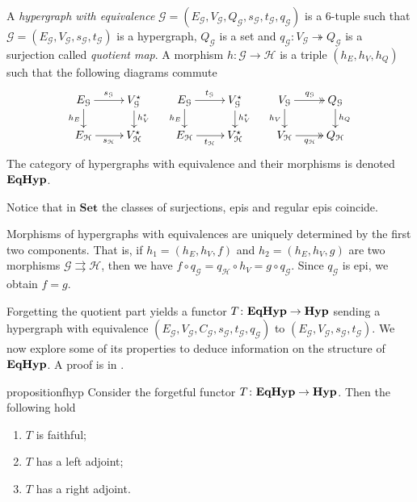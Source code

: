 \documentclass[a4paper,UKenglish,cleveref,pdftex,thm-restate,numberwithinsect]{lipics-v2021}
\newcommand{\Set}{\mathbf{Set}}
\newcommand{\catname}[1]{\textbf{\textup{#1}}}
\newcommand{\hyp}{\catname{Hyp}}
\newcommand{\EqHyp}{\catname{EqHyp}} %
\newcommand{\eto}{\twoheadrightarrow}
\begin{document}
\begin{definition}
	A \emph{hypergraph with equivalence} $\mathcal{G} = (E_\mathcal{G}, V_{\mathcal{G}}, Q_\mathcal{G}, s_\mathcal{G}, t_\mathcal{G}, q_\mathcal{G})$ is a 6-tuple such that $\mathcal{G} = (E_\mathcal{G}, V_{\mathcal{G}}, s_\mathcal{G}, t_\mathcal{G})$ is a hypergraph, $Q_\mathcal{G}$ is a set and $q_{\mathcal{G}}: V_{\mathcal{G}}\eto Q_{\mathcal{G}}$ is a surjection called \emph{quotient map}. 
	A morphism $h\colon \mathcal{G\to H}$ is a triple $(h_E, h_V, h_Q)$ such that the following diagrams commute
	\[\xymatrix@R=15pt{
		{E_\mathcal{G}}\ar[r]^{s_\mathcal{G}}\ar[d]_{h_E} & {V_{\mathcal{G}}^\star}\ar[d]^{h_V^\star} & {E_\mathcal{G}}\ar[r]^{t_\mathcal{G}}\ar[d]_{h_E} & {V_{\mathcal{G}}^\star}\ar[d]^{h_V^\star} & {V_\mathcal{G}}\ar@{>>}[r]^{q_\mathcal{G}}\ar[d]_{h_V} & {Q_{\mathcal{G}}} \ar[d]^{h_Q} \\
		{E_\mathcal{H}}\ar[r]_{s_\mathcal{H}} & {V_{\mathcal{H}}^\star}	& {E_\mathcal{H}}\ar[r]_{t_\mathcal{H}} & {V_{\mathcal{H}}^\star}& {V_\mathcal{H}}\ar@{>>}[r]_{q_\mathcal{H}} & {Q_\mathcal{H}}
	}\]
	The category of hypergraphs with equivalence and their morphisms is denoted $\EqHyp$.
	
\end{definition}

\begin{remark}
	Notice that in $\Set$ the classes of surjections, epis and regular epis coincide.
\end{remark}

\begin{remark}\label{rem:eqhyp_morphs}
	Morphisms of hypergraphs with equivalences are uniquely determined by the first two components. That is, if $h_1 = (h_E, h_V, f)$ and $h_2 = (h_E, h_V, g)$ are two morphisms $\mathcal{G} \rightrightarrows \mathcal{H}$, then we have
	$
	f \circ q_\mathcal{G} = q_\mathcal{H}\circ h_V =g\circ q_\mathcal{G}.
	$
	Since $q_\mathcal{G}$ is epi, we obtain $f = g$.
\end{remark}

Forgetting the quotient part yields a functor $T\colon \EqHyp \to \hyp$ sending a hypergraph with equivalence $(E_\mathcal{G}, V_{\mathcal{G}}, C_\mathcal{G}, s_\mathcal{G}, t_\mathcal{G}, q_\mathcal{G})$ to $(E_{\mathcal{G}}, V_{\mathcal{G}}, s_\mathcal{G}, t_{\mathcal{G}})$.   We now explore some of its properties to deduce information on the structure of $\EqHyp$.  
%
A proof is in .


\begin{restatable}{proposition}{fhyp}\label{prop:forghyp}  Consider the forgetful functor $T\colon \EqHyp \to \hyp$. Then the following hold
	\begin{enumerate}
		\item$T$ is faithful;
		\item $T$ has a left adjoint;
		\item $T$ has a right adjoint.
	\end{enumerate}
\end{restatable}
\end{document}
